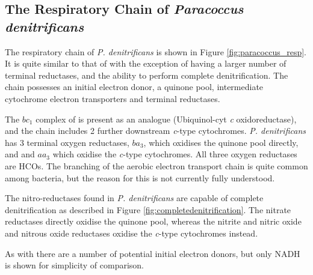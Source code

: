 \subsection{The Respiratory Chain of \textit{Paracoccus denitrificans}}
The respiratory chain of \textit{P. denitrificans} is shown in Figure \ref{fig:paracoccus_resp}. It is quite similar to that of \Nm{} with the exception of having a larger number of terminal reductases, and the ability to perform complete denitrification. The chain possesses an initial electron donor, a quinone pool, intermediate cytochrome electron transporters and terminal reductases.

The $bc_1$ complex of \Nm{} is present as an analogue (Ubiquinol-cyt \textit{c} oxidoreductase), and the chain includes 2 further downstream \textit{c}-type cytochromes. \textit{P. denitrificans} has 3 terminal oxygen reductases, $ba_3$, which oxidises the quinone pool directly, and \cbbthree{} and $aa_3$ which oxidise the \textit{c}-type cytochromes. All three oxygen reductases are HCOs. The branching of the aerobic electron transport chain is quite common among bacteria, but the reason for this is not currently fully understood.

The nitro-reductases found in \textit{P. denitrificans} are capable of complete denitrification as described in Figure \ref{fig:completedenitrification}. The nitrate reductases directly oxidise the quinone pool, whereas the nitrite and nitric oxide and nitrous oxide reductases oxidise the \textit{c}-type cytochromes instead.

As with \Nm{} there are a number of potential initial electron donors, but only NADH is shown for simplicity of comparison.

